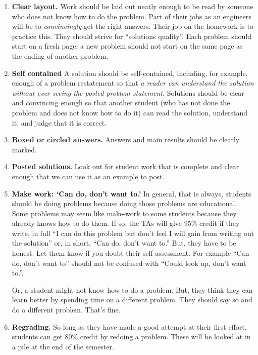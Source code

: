 \documentclass[11pt]{article}
\begin{document}
\begin{enumerate}
\begin{enumerate}
\item \textbf{Clear layout.} Work should be laid out neatly enough to be read by someone who does not know how to do the problem. Part of their jobs as an engineers will be to \textit{convincingly} get the right answers. Their job on the homework is to practice this. They should strive for  ``solutions quality''. Each problem should start on a fresh page; a new problem should not start on the same page as the ending of another problem.

\item \textbf{Self contained}  A solution should be self-contained, including, for example, enough of a problem restatement so that \textit{a reader can understand the solution without ever seeing the posted  problem statement.} Solutions should be clear and convincing enough so that another student (who has not done the problem and does not know how to do it) can read the  solution, understand it, and judge that it is correct.  

\item \textbf{Boxed or circled answers.} Answers and main results should be clearly marked. 

\item \textbf{Posted solutions.} Look out for student work that is complete and clear enough that we can use it  as an example
to post.

\item \textbf{Make work: `Can do, don't want to.'}  In general, that is always,  students should be doing problems because doing those problems are educational. Some problems may seem like make-work to some students because they already knows how to do them. If so, the TAs will give 95\% credit if they write, in full ``I can do this problem but don't feel I will gain from writing out the solution'' or, in short, ``Can do, don't want to.''  But, they have to be honest.  Let them know if you doubt their self-assessment.  For example ``Can do, don't want to'' should not be confused with ``Could look up, don't want to.''.

Or, a student might not know how to do a problem. But,  they think they can learn better by spending time on a different problem. They should say so and do a different problem. That's fine.


\item \textbf{Regrading.} So long as they  have made a good attempt at their first effort, students  can get 80\% credit by redoing a problem. These will be looked at in a pile at the end of the semester.


\end{enumerate}
\end{enumerate}
\end{document}

